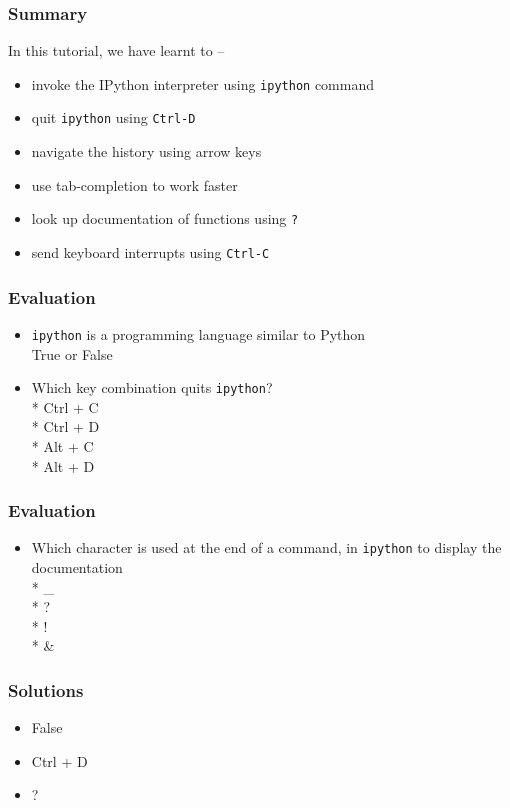 \documentclass[presentation]{beamer}
\begin{document}
\begin{frame}
\frametitle{Summary}
\label{sec-10}
In this tutorial, we have learnt to --
\begin{itemize}
\item invoke the IPython interpreter using \texttt{ipython} command 
\item quit \texttt{ipython} using \texttt{Ctrl-D}
\item navigate the history using arrow keys
\item use tab-completion to work faster
\item look up documentation of functions using \texttt{?}
\item send keyboard interrupts using \texttt{Ctrl-C}
\end{itemize}
\end{frame}
\begin{frame}
\frametitle{Evaluation}
\label{sec-11}

\begin{itemize}
\item \texttt{ipython} is a programming language similar to Python  \\
 True or False\\ 
 \vspace*{20pt}
 \item   Which key combination quits \texttt{ipython}?\\
 \vspace*{10pt}
  * Ctrl + C\\
  * Ctrl + D\\
  * Alt + C\\
  * Alt + D\\
\end{itemize} 
\end{frame}
\begin{frame}
\frametitle{Evaluation}
\label{sec-12}

\begin{itemize}
\item Which character is used at the end of a command, in \texttt{ipython} to display the documentation\\ 
\vspace*{10pt}
 * \_\\
 * ?\\
 * !\\
 * \&\\ 
\end{itemize}
\end{frame}
\begin{frame}
\frametitle{Solutions}
\label{sec-13}

\begin{itemize}
\item False
\vspace*{10pt}
\item Ctrl + D
\vspace*{10pt}
\item ?
\end{itemize}
\end{frame}
\end{document}
